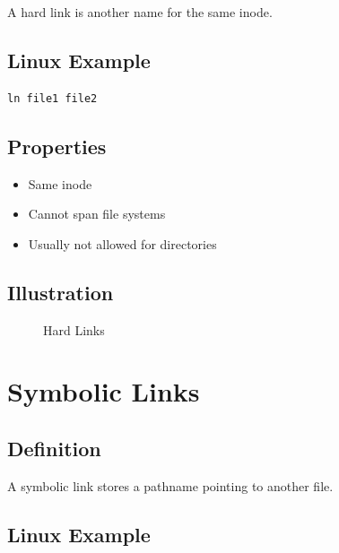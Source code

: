 A hard link is another name for the same inode.

\subsection{Linux Example}

\begin{verbatim}
ln file1 file2
\end{verbatim}

\subsection{Properties}

\begin{itemize}
\item Same inode
\item Cannot span file systems
\item Usually not allowed for directories
\end{itemize}

\subsection{Illustration}

\begin{figure}[h]
\centering
{}
\caption{Hard Links}
\end{figure}

\section{Symbolic Links}

\subsection{Definition}

A symbolic link stores a pathname pointing to another file.

\subsection{Linux Example}

